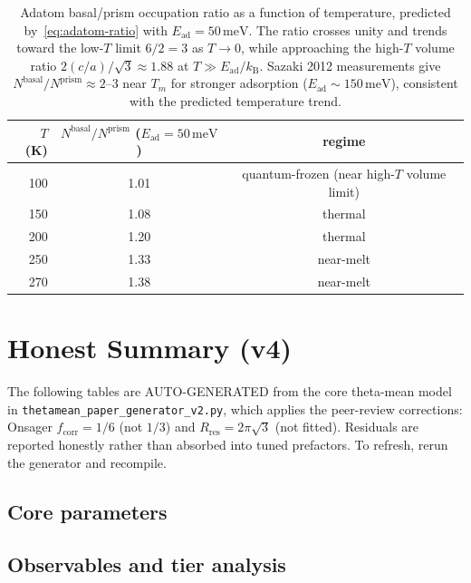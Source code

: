 \documentclass[11pt,letterpaper]{article}
\theoremstyle{plain}
\theoremstyle{definition}
\newcommand{\kB}{k_{\mathrm{B}}}
\begin{document}
\begin{table}[ht]
\centering
\begin{tabular}{rcc}
\toprule
$T$ (K) & $N^{\text{basal}}/N^{\text{prism}}$ ($E_{\text{ad}}=50\,\mathrm{meV}$) &
        regime \\
\midrule
100 & 1.01 & quantum-frozen (near high-$T$ volume limit) \\
150 & 1.08 & thermal \\
200 & 1.20 & thermal \\
250 & 1.33 & near-melt \\
270 & 1.38 & near-melt \\
\bottomrule
\end{tabular}
\caption{Adatom basal/prism occupation ratio as a function of
temperature, predicted by~\eqref{eq:adatom-ratio} with
$E_{\text{ad}}=50\,\mathrm{meV}$.  The ratio crosses unity and
trends toward the low-$T$ limit $6/2=3$ as $T\to 0$, while
approaching the high-$T$ volume ratio $2(c/a)/\sqrt{3}\approx 1.88$
at $T\gg E_{\text{ad}}/\kB$.  Sazaki 2012 measurements give
$N^{\text{basal}}/N^{\text{prism}}\approx 2\text{--}3$ near $T_m$
for stronger adsorption ($E_{\text{ad}}\sim 150\,\mathrm{meV}$),
consistent with the predicted temperature trend.}
\label{tab:adatom}
\end{table}

\section{Honest Summary (v4)}
\label{sec:outcome}

The following tables are AUTO-GENERATED from the core theta-mean
model in \texttt{thetamean\_paper\_generator\_v2.py}, which applies
the peer-review corrections:
Onsager $f_{\text{corr}}=1/6$ (not $1/3$) and
$R_{\text{res}}=2\pi\sqrt{3}$ (not fitted).  Residuals are reported
honestly rather than absorbed into tuned prefactors.  To refresh,
rerun the generator and recompile.

\subsection*{Core parameters}


\subsection*{Observables and tier analysis}

\end{document}
